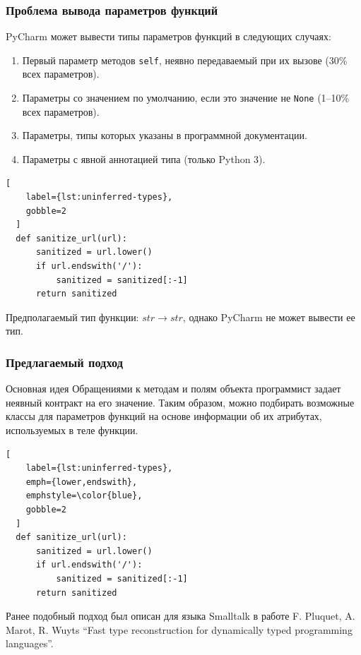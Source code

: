 \documentclass[handout]{beamer}
\begin{document}
\begin{frame}[fragile]
  \frametitle{Проблема вывода параметров функций}

  PyCharm может вывести типы параметров функций в следующих случаях:
  \begin{enumerate}
    \item Первый параметр методов \texttt{self}, неявно передаваемый при их
      вызове (30\% всех параметров).

    \item Параметры со значением по умолчанию, если это значение не
      \texttt{None} (1--10\% всех параметров).

    \item Параметры, типы которых указаны в программной документации.

    \item Параметры с явной аннотацией типа (только Python 3).
  \end{enumerate}

  \begin{lstlisting}[
    label={lst:uninferred-types},
    gobble=2
  ]
  def sanitize_url(url):
      sanitized = url.lower()
      if url.endswith('/'):
          sanitized = sanitized[:-1]
      return sanitized
  \end{lstlisting}

  Предполагаемый тип функции: $str \rightarrow str$, однако PyCharm не может вывести ее
тип.

\end{frame}

\begin{frame}[fragile]
  \frametitle{Предлагаемый подход}
  
  \begin{block}{Основная идея}
    Обращениями к методам и полям объекта программист задает неявный контракт на
    его значение. Таким образом, можно подбирать возможные классы для
    параметров функций на основе информации об их атрибутах, используемых в теле
    функции. 
  \end{block}

  \begin{lstlisting}[
    label={lst:uninferred-types},
    emph={lower,endswith},
    emphstyle=\color{blue},
    gobble=2
  ]
  def sanitize_url(url):
      sanitized = url.lower()
      if url.endswith('/'):
          sanitized = sanitized[:-1]
      return sanitized
  \end{lstlisting}

  Ранее подобный подход был описан для языка Smalltalk в работе F.
  Pluquet, A.  Marot, R. Wuyts ``Fast type reconstruction for dynamically
  typed programming languages''.

\end{frame}
\end{document}
